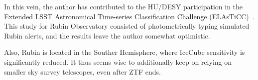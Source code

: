 In this vein, the author has contributed to the HU/DESY participation in the Extended LSST Astronomical Time-series Classification Challenge (ELAsTiCC)~. This study for Rubin Observatory consisted of photometrically typing simulated Rubin alerts, and the results leave the author somewhat optimistic.

Also, Rubin is located in the Souther Hemisphere, where IceCube sensitivity is significantly reduced. It thus seems wise to additionally keep on relying on smaller sky survey telescopes, even after ZTF ends.
